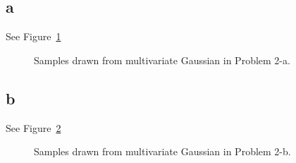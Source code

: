 \documentclass[a4paper,11pt]{article}
\theoremstyle{mytheor}
\begin{document}
\subsection*{a}\label{sec:2a}
See Figure~\ref{fig:2a}
\begin{figure}[h]
	\caption{Samples drawn from multivariate Gaussian in Problem 2-a.}
	\label{fig:2a}
\end{figure}

\subsection*{b}\label{sec:2b}
See Figure~\ref{fig:2b}
\begin{figure}[h]
	\caption{Samples drawn from multivariate Gaussian in Problem 2-b.}
	\label{fig:2b}
\end{figure}
\end{document}
